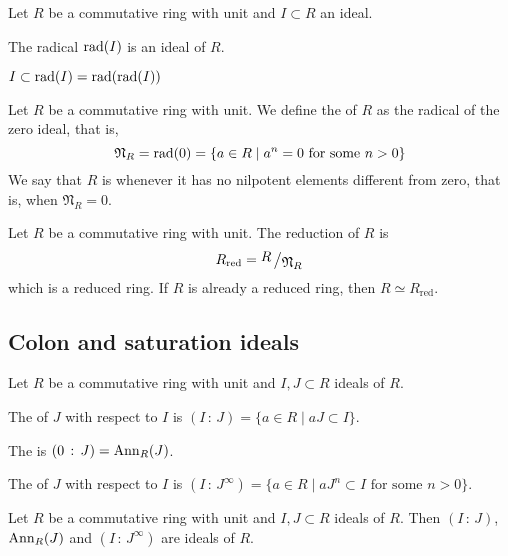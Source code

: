 \begin{prop}
	Let $R$ be a commutative ring with unit and $I \subset R$ an ideal.
	\begin{enumerateprop}
		\item The radical $\mathrm{rad}(I)$ is an ideal of $R$.
		\item $I \subset \mathrm{rad}(I) = \mathrm{rad}(\mathrm{rad}(I))$
	\end{enumerateprop}
\end{prop}

\begin{definition}
	Let $R$ be a commutative ring with unit. We define the  of $R$ as the radical of the zero ideal, that is,
	\[
		\mathfrak{N}_R = 
		\mathrm{rad}(0) = 
		\{
			a \in R \mid a^n = 0 \text{ for some } n > 0
		\}
	\]
	We say that $R$ is  whenever it has no nilpotent elements different from zero, that is, when $\mathfrak{N}_R = 0$.
\end{definition}

\begin{prop}
	Let $R$ be a commutative ring with unit. The reduction of $R$ is
	\[
		R_\text{red} = \quotient{R}{\mathfrak{N}_R}
	\]
	which is a reduced ring. If $R$ is already a reduced ring, then $R \simeq R_\text{red}$.
\end{prop}

\subsection{Colon and saturation ideals}

\begin{definition}
	Let $R$ be a commutative ring with unit and $I, J \subset R$ ideals of $R$. 
	\begin{enumeratedef}
		\item The  of $J$ with respect to $I$ is $(I \, : \, J) = \{ a \in R \mid a J \subset I \}$.
		\item The  is $(0 \, : \, J) = \mathrm{Ann}_{R}(J)$.
		\item The  of $J$ with respect to $I$ is $(I \, : \, J^\infty) = \{ a \in R \mid a J^n \subset I \text{ for some } n > 0 \}$.
	\end{enumeratedef}
\end{definition}

\begin{prop}
	Let $R$ be a commutative ring with unit and $I, J \subset R$ ideals of $R$. Then $(I \, \colon \, J)$, $\mathrm{Ann}_{R}(J)$ and $(I \, : \, J^\infty)$ are ideals of $R$.
\end{prop}

